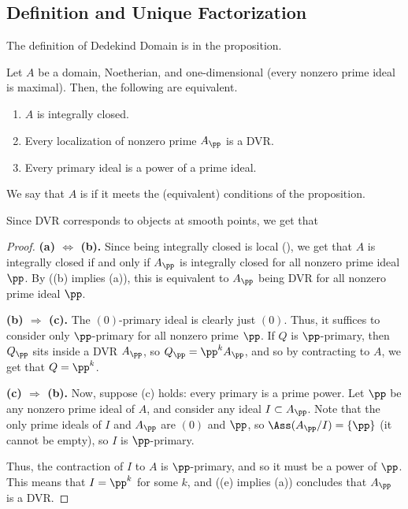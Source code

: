 \subsection{Definition and Unique Factorization}
The definition of Dedekind Domain is in the proposition.
\begin{proposition}
    Let $A$ be a domain, Noetherian, and one-dimensional
    (every nonzero prime ideal is maximal).
    Then, the following are equivalent.
    \begin{enumerate}[label=(\alph*)]
    \item $A$ is integrally closed.
    \item Every localization of nonzero prime  $A_\pp$ is a DVR.
    \item Every primary ideal is a power of a prime ideal.
    \end{enumerate}
    We say that $A$ is  if
    it meets the (equivalent) conditions of the proposition.
\end{proposition}
Since DVR corresponds to objects at smooth points,
we get that 
\begin{center}
\end{center}
\begin{proof}
    \textbf{(a) $\Leftrightarrow$ (b).}
    Since being integrally closed is local (),
    we get that $A$ is integrally closed 
    if and only if $A_\pp$ is integrally closed for 
    all nonzero prime ideal $\pp$.
    By  ((b) implies (a)), this is equivalent to
    $A_\pp$ being DVR for all nonzero prime ideal $\pp$.

    \textbf{(b) $\Rightarrow$ (c).}
    The $(0)$-primary ideal is clearly just $(0)$.
    Thus, it suffices to consider only $\pp$-primary
    for all nonzero prime $\pp$.
    If $Q$ is $\pp$-primary, then
    $Q_\pp$ sits inside a DVR $A_\pp$, so $Q_\pp = \pp^kA_\pp$,
    and so by contracting to $A$, we get that $Q=\pp^k$.

    \textbf{(c) $\Rightarrow$ (b).}
    Now, suppose (c) holds: every primary is a prime power.
    Let $\pp$ be any nonzero prime ideal of $A$,
    and consider any ideal $I\subset A_\pp$.
    Note that the only prime ideals of $I$ and $A_\pp$
    are $(0)$ and $\pp$, so $\Ass(A_\pp/I) = \{\pp\}$
    (it cannot be empty),
    so $I$ is $\pp$-primary.

    Thus, the contraction of $I$ to $A$ is $\pp$-primary,
    and so it must be a power of $\pp$.
    This means that $I = \pp^k$ for some $k$,
    and  ((e) implies (a)) concludes that 
    $A_\pp$ is a DVR.
\end{proof}
